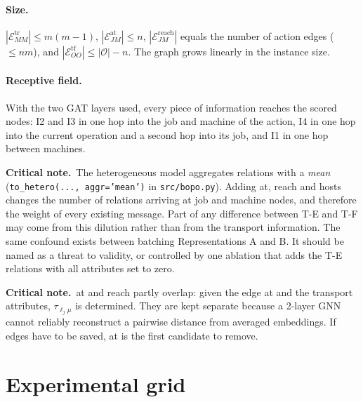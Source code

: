 \documentclass[11pt,a4paper]{article}
\newcommand{\Oset}{\mathcal{O}}
\newcommand{\Eset}{\mathcal{E}}
\newcommand{\loc}{\ell}
\newcommand{\crit}[1]{\par\smallskip\noindent\textbf{Critical note.}\ #1\par\smallskip}
\begin{document}
\paragraph{Size.}
$|\Eset^{\mathrm{tr}}_{MM}|\le m(m-1)$, $|\Eset^{\mathrm{at}}_{JM}|\le n$,
$|\Eset^{\mathrm{reach}}_{JM}|$ equals the number of action edges ($\le nm$), and
$|\Eset^{\mathrm{tf}}_{OO}|\le|\Oset|-n$. The graph grows linearly in the
instance size.

\paragraph{Receptive field.} With the two GAT layers used, every piece of
information reaches the scored nodes: I2 and I3 in one hop into the job and
machine of the action, I4 in one hop into the current operation and a second hop
into its job, and I1 in one hop between machines.

\crit{The heterogeneous model aggregates relations with a \emph{mean}
(\texttt{to\_hetero(..., aggr='mean')} in \texttt{src/bopo.py}). Adding
\textsf{at}, \textsf{reach} and \textsf{hosts} changes the number of relations
arriving at job and machine nodes, and therefore the weight of every existing
message. Part of any difference between T-E and T-F may come from this dilution
rather than from the transport information. The same confound exists between
batching Representations A and B. It should be named as a threat to validity,
or controlled by one ablation that adds the T-E relations with all attributes
set to zero.}

\crit{\textsf{at} and \textsf{reach} partly overlap: given the edge \textsf{at}
and the \textsf{transport} attributes, $\tau_{\loc_j\mu}$ is determined. They
are kept separate because a 2-layer GNN cannot reliably reconstruct a pairwise
distance from averaged embeddings. If edges have to be saved, \textsf{at} is the
first candidate to remove.}

\section{Experimental grid}
\label{sec:grid}
\end{document}
